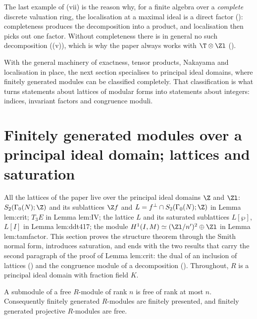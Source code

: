 \begin{remark}\label{rem:modules:localisation-factor}
The last example of (vii) is the reason why, for a finite algebra over a \emph{complete} discrete valuation ring, the
localisation at a maximal ideal is a direct factor (): completeness produces the
decomposition into a product, and localisation then picks out one factor. Without completeness there is in general no
such decomposition ((v)), which is why the paper always works with $\T\otimes\Zl$ ().
\end{remark}

With the general machinery of exactness, tensor products, Nakayama and localisation in place, the next section specialises to
principal ideal domains, where finitely generated modules can be classified completely. That classification is what turns
statements about lattices of modular forms into statements about integers: indices, invariant factors and congruence moduli.

\section[Modules over a principal ideal domain]{Finitely generated modules over a principal ideal domain; lattices and saturation}\label{sec:modules:pid}

All the lattices of the paper live over the principal ideal domains $\Z$ and $\Zl$: $S_2(\Gamma_0(N);\Z)$ and its sublattices
$\Z f$ and $L=f^\perp\cap S_2(\Gamma_0(N);\Z)$ in Lemma lem:crit; $T_3E$ in Lemma lem:IV; the lattice $L$ and its saturated
sublattices $L[\wp]$, $L[I]$ in Lemma lem:ddt417; the module $H^1(I,M)\simeq(\Zl/n')^2\oplus\Zl$ in Lemma lem:tamfactor. This section proves the
structure theorem through the Smith normal form, introduces saturation, and ends with the two results that carry the
second paragraph of the proof of Lemma lem:crit: the dual of an inclusion of lattices () and
the congruence module of a decomposition (). Throughout, $R$ is a principal ideal
domain with fraction field $K$.

\begin{theorem}\label{thm:modules:submodule-free}
A submodule of a free $R$-module of rank $n$ is free of rank at most $n$. Consequently finitely generated $R$-modules are finitely
presented, and finitely generated projective $R$-modules are free.
\end{theorem}

